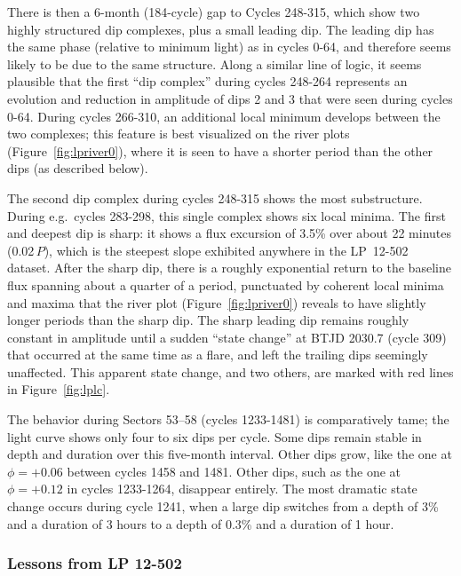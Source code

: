 \documentclass[11pt,twocolumn,tighten]{aastex63}
\begin{document}
There is then a 6-month (184-cycle) gap to Cycles 248-315, which show
two highly structured dip complexes, plus a small leading dip.  The
leading dip has the same phase (relative to minimum light) as in
cycles 0-64, and therefore seems likely to be due to the same
structure.  Along a similar line of logic, it seems plausible that the
first ``dip complex'' during cycles 248-264 represents an evolution
and reduction in amplitude of dips 2 and 3 that were seen during
cycles 0-64.  During cycles 266-310, an additional local minimum
develops between the two complexes; this feature is best visualized on
the river plots (Figure~\ref{fig:lpriver0}), where it is seen to have
a shorter period than the other dips (as described below).

The second dip complex during cycles 248-315 shows the most
substructure.  During e.g.~cycles 283-298, this single complex shows
six local minima.  The first and deepest dip is sharp: it shows a flux
excursion of 3.5\% over about 22 minutes (0.02\,$P$), which is the
steepest slope exhibited anywhere in the LP~12-502 dataset.  After the
sharp dip, there is a roughly exponential return to the baseline flux
spanning about a quarter of a period, punctuated by coherent local
minima and maxima that the river plot (Figure~\ref{fig:lpriver0})
reveals to have slightly longer periods than the sharp dip.  The sharp
leading dip remains roughly constant in amplitude until a sudden
``state change'' at BTJD 2030.7 (cycle 309) that occurred at the same
time as a flare, and left the trailing dips seemingly unaffected.
This apparent state change, and two others, are marked with red lines
in Figure~\ref{fig:lplc}.

The behavior during Sectors 53--58 (cycles 1233-1481) is comparatively
tame; the light curve shows only four to six dips per cycle.  Some
dips remain stable in depth and duration over this five-month
interval.  Other dips grow, like the one at $\phi = +0.06$ between
cycles 1458 and 1481.  Other dips, such as the one at $\phi = +0.12$
in cycles 1233-1264, disappear entirely.  The most dramatic state
change occurs during cycle 1241, when a large dip switches from a
depth of 3\% and a duration of 3 hours to a depth of 0.3\% and a
duration of 1 hour.


\subsubsection{Lessons from LP 12-502}
\label{subsec:lplessons}
\end{document}
